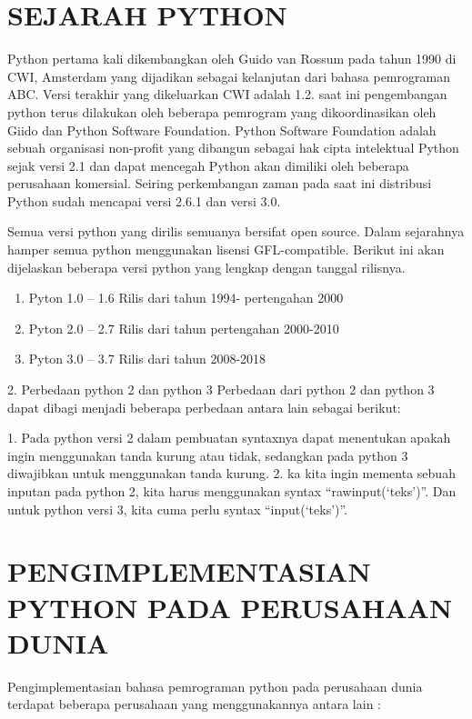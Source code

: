 \chapter*{ SEJARAH PYTHON}

\par
	Python  pertama kali dikembangkan oleh Guido van Rossum pada tahun 1990 di CWI, Amsterdam  yang dijadikan sebagai kelanjutan dari bahasa pemrograman ABC. Versi terakhir yang dikeluarkan CWI adalah 1.2. saat ini pengembangan python terus dilakukan oleh beberapa pemrogram yang dikoordinasikan oleh Giido dan  Python Software Foundation. Python Software Foundation adalah sebuah organisasi non-profit yang dibangun sebagai hak cipta intelektual Python sejak versi 2.1 dan dapat mencegah Python akan dimiliki oleh beberapa perusahaan komersial. Seiring perkembangan zaman pada saat ini distribusi Python sudah mencapai versi 2.6.1 dan versi 3.0.
\par
    Semua versi python yang dirilis semuanya bersifat open source. Dalam sejarahnya hamper semua python menggunakan lisensi GFL-compatible. Berikut ini akan dijelaskan beberapa versi python  yang lengkap dengan tanggal rilisnya.

		
\begin{enumerate}
\item Pyton 1.0 – 1.6 Rilis dari tahun 1994- pertengahan 2000
\item Pyton 2.0 – 2.7 Rilis dari tahun pertengahan 2000-2010 
\item Pyton 3.0 – 3.7 Rilis dari tahun 2008-2018
\end{enumerate}

\par
	2.	Perbedaan python 2 dan python 3
Perbedaan dari python 2 dan python 3 dapat dibagi menjadi beberapa perbedaan antara lain sebagai berikut:


1.	Pada python versi 2 dalam pembuatan syntaxnya  dapat menentukan apakah ingin menggunakan tanda kurung atau tidak, sedangkan pada python 3 diwajibkan untuk menggunakan tanda kurung.
2.	ka kita ingin mementa sebuah inputan pada python 2, kita harus menggunakan syntax “rawinput(‘teks’)”. Dan untuk python versi 3, kita cuma perlu syntax “input(‘teks’)”.


\chapter*{ PENGIMPLEMENTASIAN PYTHON PADA PERUSAHAAN DUNIA}

\par
Pengimplementasian bahasa pemrograman python pada perusahaan dunia terdapat  beberapa  perusahaan yang menggunakannya antara lain :

